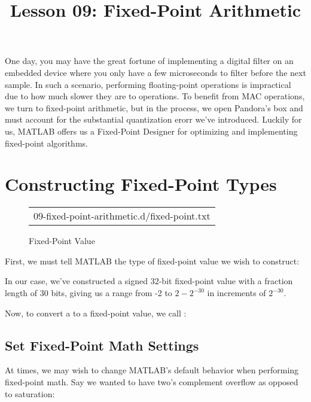 \documentclass{article}
\title{Lesson 09: Fixed-Point Arithmetic}
\begin{document}
\renderTitle

One day, you may have the great fortune of implementing a digital filter
on an embedded device where you only have a few microseconds to filter
before the next sample.  In such a scenario, performing floating-point
operations is impractical due to how much slower they are to  operations.  To benefit from MAC operations,
we turn to fixed-point arithmetic, but in the process, we open Pandora's
box and must account for the substantial quantization erorr we've
introduced.  Luckily for us, MATLAB offers us a Fixed-Point Designer%
 for
optimizing and implementing fixed-point algorithms.

\section{Constructing Fixed-Point Types}

\begin{figure}[!ht]
\Centering
\small
\begin{tabular}{c}
	{09-fixed-point-arithmetic.d/fixed-point.txt}
\end{tabular}
\caption{Fixed-Point Value}
\end{figure}

First, we must tell MATLAB the type of fixed-point value we wish to
construct:


In our case, we've constructed a signed 32-bit fixed-point value with a
fraction length of 30 bits, giving us a range from -2 to \(2 - 2^{-30}\)
in increments of \(2^{-30}\).

Now, to convert a  to a fixed-point value, we call
:


\subsection{Set Fixed-Point Math Settings}

At times, we may wish to change MATLAB's default behavior when
performing fixed-point math.  Say we wanted to have two's complement
overflow as opposed to saturation:
\end{document}
